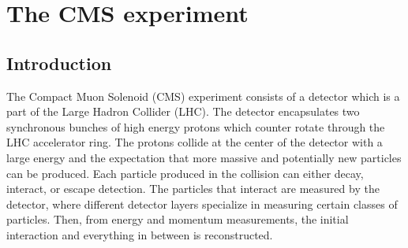 \setcounter{secnumdepth}{3}
\setcounter{tocdepth}{3}
\setlength{\parskip}{\smallskipamount}
\setlength{\parindent}{0pt}


\makeatletter


\providecommand{\tabularnewline}{\\}


\makeatother


\chapter{The CMS experiment}

\section{Introduction} The Compact Muon Solenoid (CMS) experiment consists of a detector which is a part of the Large Hadron Collider (LHC). The detector encapsulates two synchronous bunches of high energy protons  which counter rotate through the LHC accelerator ring.  The protons collide at the center of the detector with a large energy and the expectation that more massive and potentially new particles can be produced. Each particle produced in the collision can either decay, interact, or escape detection. The particles that interact are measured by the detector, where different detector layers specialize in measuring certain classes of particles. Then, from energy and momentum measurements, the initial interaction and everything in between is reconstructed.   



